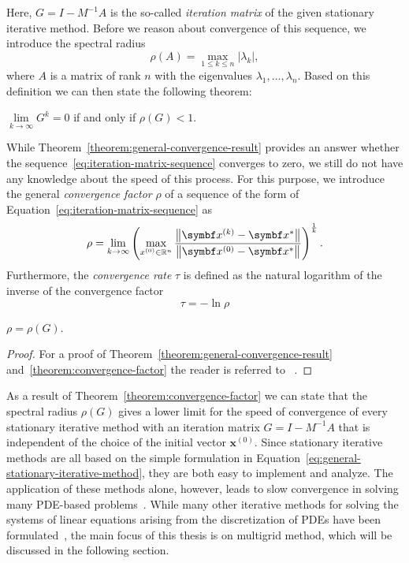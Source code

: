 Here, $G = I - M^{-1} A$ is the so-called \emph{iteration matrix} of the given stationary iterative method.
Before we reason about convergence of this sequence, we introduce the spectral radius 
\begin{equation}
	\rho (A)=\max \limits_{1 \leq k \leq n} |\lambda _{k}|,
\end{equation}
where $A$ is a matrix of rank $n$ with the eigenvalues $\lambda_{1}, \dots, \lambda_{n}$.
Based on this definition we can then state the following theorem:
\begin{theorem}
$\lim \limits_{k \to  \infty} G^k = 0$ if and only if $\rho(G) < 1$.
\label{theorem:general-convergence-result}
\end{theorem}

While Theorem~\ref{theorem:general-convergence-result} provides an answer whether the sequence~\eqref{eq:iteration-matrix-sequence} converges to zero, we still do not have any knowledge about the speed of this process.
For this purpose, we introduce the general \emph{convergence factor} $\rho$ of a sequence of the form of Equation~\eqref{eq:iteration-matrix-sequence} as
\begin{equation}
	\rho = \lim \limits_{k \to  \infty} \left( \max \limits_{x^{(0)} \in \mathbb{R}^{n}} \frac{\norm{\bm{x}^{(k)} - \bm{x}^{*}}}{\norm{\bm{x}^{(0)} - \bm{x}^{*}}} \right)^{\frac{1}{k}}.
\end{equation} 
Furthermore, the \emph{convergence rate} $\tau$ is defined as the natural logarithm of the inverse of the convergence factor
\begin{equation}
	\tau = -\ln \rho
\end{equation}
\begin{theorem}
	$\rho = \rho(G)$.
	\label{theorem:convergence-factor}
\end{theorem}
\begin{proof}
	For a proof of Theorem~\ref{theorem:general-convergence-result} and~\ref{theorem:convergence-factor} the reader is referred to ~\cite{varga1962iterative,saad2003iterative}.
\end{proof}
As a result of Theorem~\ref{theorem:convergence-factor} we can state that the spectral radius $\rho(G)$ gives a lower limit for the speed of convergence of every stationary iterative method with an iteration matrix $G = I - M^{-1} A$ that is independent of the choice of the initial vector $\bm{x}^{(0)}$.
Since stationary iterative methods are all based on the simple formulation in Equation~\eqref{eq:general-stationary-iterative-method}, they are both easy to implement and analyze.
The application of these methods alone, however, leads to slow convergence in solving many PDE-based problems~\cite{briggs2000multigrid}.
While many other iterative methods for solving the systems of linear equations arising from the discretization of PDEs have been formulated~\cite{saad2003iterative}, the main focus of this thesis is on multigrid method, which will be discussed in the following section.



